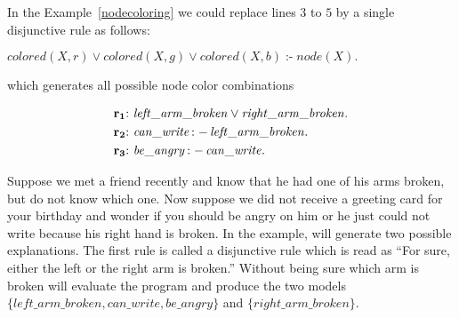 \documentclass[a4paper, titlepage]{article}
\DeclareMathOperator{\leftimpl}{:-}
\newcommand\mycenterline[1]{\par\smallskip\centerline{#1} \smallskip}
\newcommand{\rowprefix}[1]{%
  \ensuremath{\color{black}\mathbf{#1{:}}\ }%
}
\begin{document}
In the Example~\ref{nodecoloring} we could replace lines $3$ to $5$ by a single disjunctive rule as follows:
\mycenterline{$\mathit{colored(X,r)} \vee \mathit{colored(X,g)} \vee \mathit{colored(X,b)} \leftimpl \mathit{node(X).}$} 
%
which generates all possible node color combinations 
\begin{exmp}
\begin{align*}
\rowprefix{r_1}& \mathit{left\_arm\_broken} \vee 
\mathit{right\_arm\_broken}.\\
\rowprefix{r_2}& \mathit{can\_write} \leftimpl 
\mathit{left\_arm\_broken}.\\
\rowprefix{r_3}& \mathit{be\_angry} \leftimpl 
\mathit{can\_write}.
\end{align*}
\end{exmp}
Suppose we met a friend recently and know that he had one 
of his arms broken, but do not know which one. Now suppose 
we did not receive a greeting card for your birthday and 
wonder if you should be angry on him or he just could not 
write because his right hand is broken. In the example, 
\dlvhex{} will generate two possible explanations. The 
first rule is called a disjunctive rule which is read as 
\enquote{For sure, either the left or the right arm is broken.} Without being sure which arm is broken \dlvhex{} 
will evaluate the program and produce the two models 
$\mathit{\{left\_arm\_broken, can\_write, be\_angry\}}$ and 
$\mathit{\{right\_arm\_broken\}}$.
\end{document}

